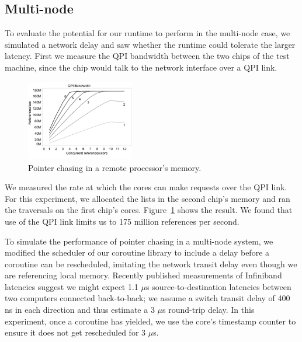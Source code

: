 \documentclass[10pt,nocopyrightspace,preprint]{sigplanconf}
\begin{document}
\subsection{Multi-node}

To evaluate the potential for our runtime to perform in the multi-node case, we simulated a network delay and saw whether the runtime could tolerate the larger latency. First we measure the QPI bandwidth between the two chips of the test machine, since the chip would talk to the network interface over a QPI link.

\begin{figure}[h]
  \begin{center}
    \includegraphics[width=0.42\textwidth]{figures/qpi_bw-edited.pdf}
  \end{center}
  \caption{Pointer chasing in a remote processor's memory.}
  \label{fig:listwalk-qpi}
\end{figure}

We measured the rate at which the cores can make requests
over the QPI link. For this experiment, we allocated the lists in the
second chip's memory and ran the traversals on the first chip's cores. Figure~\ref{fig:listwalk-qpi} shows the result. We found that use of the QPI link limits us to 175 million references per second.


To simulate the performance of pointer chasing in a
multi-node system, we modified the scheduler of our coroutine library
to include a delay before a coroutine can be rescheduled, imitating
the network transit delay even though we are referencing local
memory. Recently published measurements of Infiniband latencies
 suggest we might expect 1.1 $\mu$s source-to-destination
latencies between two computers connected back-to-back; we assume a
switch transit delay of 400 ns  in each direction and thus estimate a 3
$\mu$s round-trip delay. In this experiment, once a coroutine has
yielded, we use the core's timestamp counter to ensure it does not get
rescheduled for 3 $\mu$s.
\end{document}
